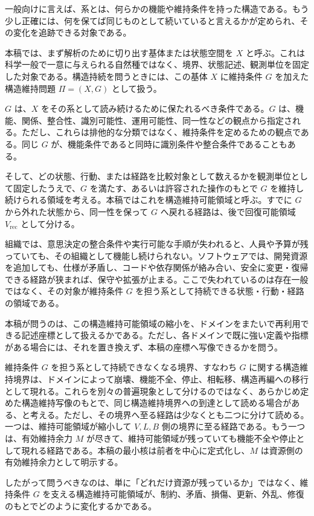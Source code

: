 \documentclass[12pt,a4paper]{article}
\begin{document}
一般向けに言えば、系とは、何らかの機能や維持条件を持った構造である。もう少し正確には、何を保てば同じものとして続いていると言えるかが定められ、その変化を追跡できる対象である。

本稿では、まず解析のために切り出す基体または状態空間を \(X\) と呼ぶ。これは科学一般で一意に与えられる自然種ではなく、境界、状態記述、観測単位を固定した対象である。構造持続を問うときには、この基体 \(X\) に維持条件 \(G\) を加えた構造維持問題 \(\Pi=(X,G)\) として扱う。

\(G\) は、\(X\) をその系として読み続けるために保たれるべき条件である。\(G\) は、機能、関係、整合性、識別可能性、運用可能性、同一性などの観点から指定される。ただし、これらは排他的な分類ではなく、維持条件を定めるための観点である。同じ \(G\) が、機能条件であると同時に識別条件や整合条件であることもある。

そして、どの状態、行動、または経路を比較対象として数えるかを観測単位として固定したうえで、\(G\) を満たす、あるいは許容された操作のもとで \(G\) を維持し続けられる領域を考える。本稿ではこれを構造維持可能領域と呼ぶ。すでに \(G\) から外れた状態から、同一性を保って \(G\) へ戻れる経路は、後で回復可能領域 \(V_{\mathrm{rec}}\) として分ける。

組織では、意思決定の整合条件や実行可能な手順が失われると、人員や予算が残っていても、その組織として機能し続けられない。ソフトウェアでは、開発資源を追加しても、仕様が矛盾し、コードや依存関係が絡み合い、安全に変更・復帰できる経路が狭まれば、保守や拡張が止まる。ここで失われているのは存在一般ではなく、その対象が維持条件 \(G\) を担う系として持続できる状態・行動・経路の領域である。

本稿が問うのは、この構造維持可能領域の縮小を、ドメインをまたいで再利用できる記述座標として扱えるかである。ただし、各ドメインで既に強い定義や指標がある場合には、それを置き換えず、本稿の座標へ写像できるかを問う。

維持条件 \(G\) を担う系として持続できなくなる境界、すなわち \(G\) に関する構造維持境界は、ドメインによって崩壊、機能不全、停止、相転移、構造再編への移行として現れる。これらを別々の普遍現象として分けるのではなく、あらかじめ定めた構造維持写像のもとで、同じ構造維持境界への到達として読める場合がある、と考える。ただし、その境界へ至る経路は少なくとも二つに分けて読める。一つは、維持可能領域が縮小して \(V,L,B\) 側の境界に至る経路である。もう一つは、有効維持余力 \(M\) が尽きて、維持可能領域が残っていても機能不全や停止として現れる経路である。本稿の最小核は前者を中心に定式化し、\(M\) は資源側の有効維持余力として明示する。

したがって問うべきなのは、単に「どれだけ資源が残っているか」ではなく、維持条件 \(G\) を支える構造維持可能領域が、制約、矛盾、損傷、更新、外乱、修復のもとでどのように変化するかである。
\end{document}
